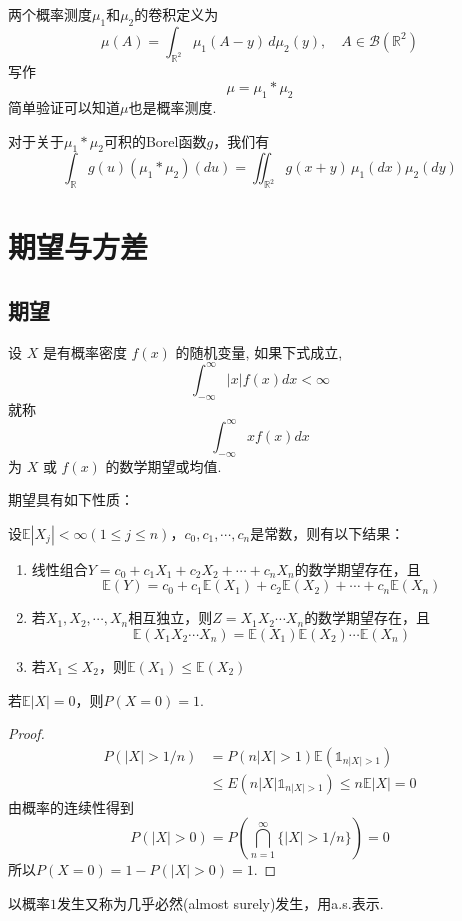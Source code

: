 两个概率测度$\mu_1$和$\mu_2$的卷积定义为
$$
    \mu(A)=\int_{\mathbb{R}^2} \mu_1(A-y) \, d\mu_2(y),\quad A\in\mathcal{B}(\mathbb{R}^2)
$$
写作
$$
    \mu=\mu_1*\mu_2
$$
简单验证可以知道$\mu$也是概率测度.

对于关于$\mu_1*\mu_2$可积的Borel函数$g$，我们有
\[
    \int_{\mathbb{R}} g(u)(\mu_1*\mu_2)(du)=\iint_{\mathbb{R}^2} g(x+y) \, \mu_1(dx)\mu_2(dy)
\]



\section{期望与方差}

\subsection{期望}

\begin{definition}[期望]
    设 $X$ 是有概率密度 $f(x)$ 的随机变量, 如果下式成立,
    $$
        \int_{-\infty}^{\infty}|x| f(x) d x<\infty
    $$
    就称
    $$
        \int_{-\infty}^{\infty} x f(x) d x
    $$
    为 $X$ 或 $f(x)$ 的数学期望或均值.
\end{definition}

期望具有如下性质：

设$\mathbb{E}|X_j|<\infty(1\leq j\leq n)$，$c_0,c_1,\cdots,c_n$是常数，则有以下结果：
\begin{enumerate}
    \item 线性组合$Y=c_0+c_1X_1+c_2X_2+\cdots+c_nX_n$的数学期望存在，且
          $$\mathbb{E}(Y)=c_0+c_1\mathbb{E}(X_1)+c_2\mathbb{E}(X_2)+\cdots+c_n\mathbb{E}(X_n)$$
    \item 若$X_1,X_2,\cdots,X_n$相互独立，则$Z=X_1X_2\cdots X_n$的数学期望存在，且
          $$\mathbb{E}(X_1X_2\cdots X_n)=\mathbb{E}(X_1)\mathbb{E}(X_2)\cdots\mathbb{E}(X_n)$$
    \item 若$X_1\leq X_2$，则$\mathbb{E}(X_1)\leq\mathbb{E}(X_2)$
\end{enumerate}

\begin{lemma}
    若$\mathbb{E}|X|=0$，则$P(X=0)=1$.
\end{lemma}

\begin{proof}
    \begin{align*}
        P(|X|>1/n) & =P(n|X|>1) \mathbb{E}(\mathbb{1}_{n|X|>1})           \\
                   & \le  E(n|X|\mathbb{1}_{n|X|>1}) \le n\mathbb{E}|X|=0
    \end{align*}
    由概率的连续性得到
    \[
        P(|X|>0)=P(\bigcap_{n=1}^{\infty} \{|X|>1/n\})=0
    \]
    所以$P(X=0)=1-P(|X|>0)=1$.
\end{proof}
以概率$1$发生又称为几乎必然(almost surely)发生，用a.s.表示.

